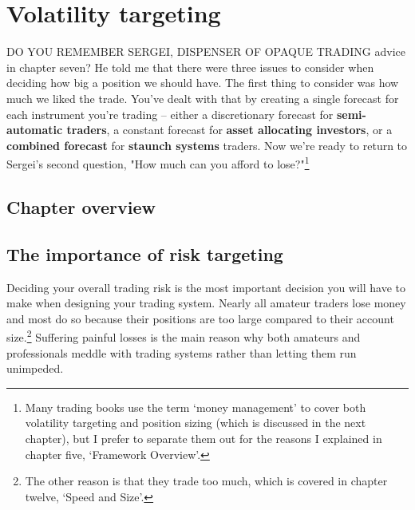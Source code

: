 \chapter{Volatility targeting}

DO YOU REMEMBER SERGEI, DISPENSER OF OPAQUE TRADING advice in chapter seven? He told me that there were three issues to consider when deciding how big a position we should have. The first thing to consider was how much we liked the trade. You've dealt with that by creating a single forecast for each instrument you're trading -- either a discretionary forecast for \textbf{semi-automatic traders}, a constant forecast for \textbf{asset allocating investors}, or a \textbf{combined forecast} for \textbf{staunch systems} traders. Now we're ready to return to Sergei's second question, "How much can you afford to lose?"\footnote{Many trading books use the term ‘money management’ to cover both volatility targeting and position sizing (which is discussed in the next chapter), but I prefer to separate them out for the reasons I explained in chapter five, ‘Framework Overview’.}

\section*{Chapter overview}  {}

\begin{chapteroverviewtable}
\end{chapteroverviewtable}

\section*{The importance of risk targeting}  {}

Deciding your overall trading risk is the most important decision you will have to make when designing your trading system. Nearly all amateur traders lose money and most do so because their positions are too large compared to their account size.\footnote{The other reason is that they trade too much, which is covered in chapter twelve, ‘Speed and Size'.} Suffering painful losses is the main reason why both amateurs and professionals meddle with trading systems rather than letting them run unimpeded.

